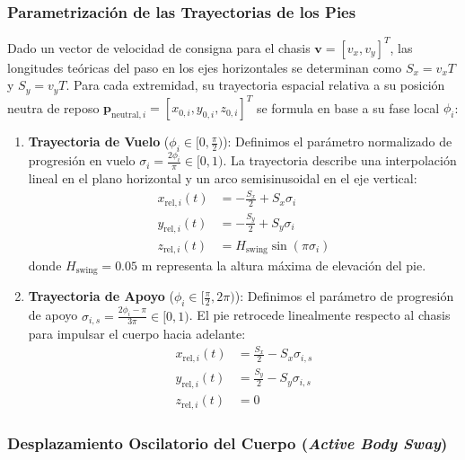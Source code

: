 \subsubsection{Parametrización de las Trayectorias de los Pies}

Dado un vector de velocidad de consigna para el chasis $\mathbf{v} = [v_x, v_y]^T$, las longitudes teóricas del paso en los ejes horizontales se determinan como $S_x = v_x T$ y $S_y = v_y T$. Para cada extremidad, su trayectoria espacial relativa a su posición neutra de reposo $\mathbf{p}_{\text{neutral}, i} = [x_{0,i}, y_{0,i}, z_{0,i}]^T$ se formula en base a su fase local $\phi_i$:

\begin{enumerate}
    \item \textbf{Trayectoria de Vuelo} ($\phi_i \in [0, \frac{\pi}{2})$): Definimos el parámetro normalizado de progresión en vuelo $\sigma_i = \frac{2\phi_i}{\pi} \in [0, 1)$. La trayectoria describe una interpolación lineal en el plano horizontal y un arco semisinusoidal en el eje vertical:
    \begin{align}
        x_{\text{rel}, i}(t) &= -\frac{S_x}{2} + S_x \sigma_i \\
        y_{\text{rel}, i}(t) &= -\frac{S_y}{2} + S_y \sigma_i \\
        z_{\text{rel}, i}(t) &= H_{\text{swing}} \sin(\pi \sigma_i)
    \end{align}
    donde $H_{\text{swing}} = 0.05\text{ m}$ representa la altura máxima de elevación del pie.

    \item \textbf{Trayectoria de Apoyo} ($\phi_i \in [\frac{\pi}{2}, 2\pi)$): Definimos el parámetro de progresión de apoyo $\sigma_{i,s} = \frac{2\phi_i - \pi}{3\pi} \in [0, 1)$. El pie retrocede linealmente respecto al chasis para impulsar el cuerpo hacia adelante:
    \begin{align}
        x_{\text{rel}, i}(t) &= \frac{S_x}{2} - S_x \sigma_{i,s} \\
        y_{\text{rel}, i}(t) &= \frac{S_y}{2} - S_y \sigma_{i,s} \\
        z_{\text{rel}, i}(t) &= 0
    \end{align}
\end{enumerate}

\subsubsection{Desplazamiento Oscilatorio del Cuerpo (\textit{Active Body Sway})}

